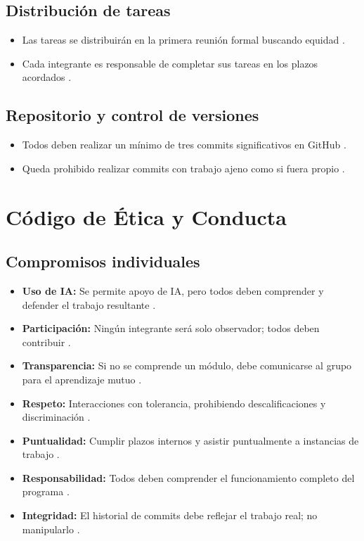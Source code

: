 \documentclass[11pt, a4paper]{article}
\begin{document}
\subsection{Distribución de tareas}
\begin{itemize}
    \item Las tareas se distribuirán en la primera reunión formal buscando equidad \cite{58}.
    \item Cada integrante es responsable de completar sus tareas en los plazos acordados \cite{60}.
\end{itemize}

\subsection{Repositorio y control de versiones}
\begin{itemize}
    \item Todos deben realizar un mínimo de tres commits significativos en GitHub \cite{67}.
    \item Queda prohibido realizar commits con trabajo ajeno como si fuera propio \cite{70}.
\end{itemize}

\section{Código de Ética y Conducta}

\subsection{Compromisos individuales}
\begin{itemize}
    \item \textbf{Uso de IA:} Se permite apoyo de IA, pero todos deben comprender y defender el trabajo resultante \cite{75, 76}.
    \item \textbf{Participación:} Ningún integrante será solo observador; todos deben contribuir \cite{79, 80}.
    \item \textbf{Transparencia:} Si no se comprende un módulo, debe comunicarse al grupo para el aprendizaje mutuo \cite{81, 82}.
    \item \textbf{Respeto:} Interacciones con tolerancia, prohibiendo descalificaciones y discriminación \cite{83, 84}.
    \item \textbf{Puntualidad:} Cumplir plazos internos y asistir puntualmente a instancias de trabajo \cite{85}.
    \item \textbf{Responsabilidad:} Todos deben comprender el funcionamiento completo del programa \cite{86}.
    \item \textbf{Integridad:} El historial de commits debe reflejar el trabajo real; no manipularlo \cite{91, 92}.
\end{itemize}
\end{document}
